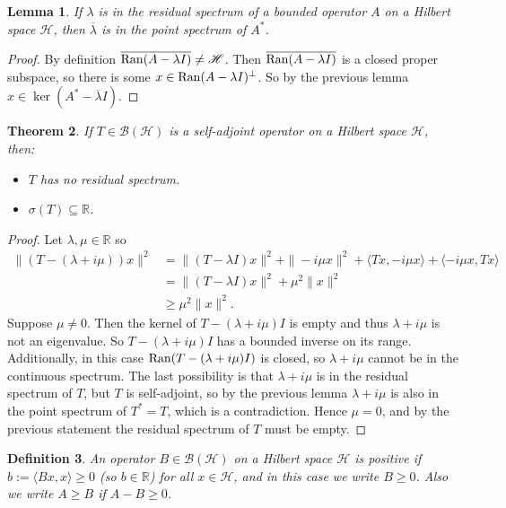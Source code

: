 \documentclass[12pt,oneside]{report}
\newtheorem{thm}{Theorem}[chapter]
\newtheorem{lem}[thm]{Lemma}
\newtheorem{defn}[thm]{Definition}
\begin{document}
\begin{lem}
    If $\lambda$ is in the residual spectrum of a bounded operator $A$ on a Hilbert space $\mathscr{H}$, then $\overline{\lambda}$ is in the point spectrum of $A^{*}$.
\end{lem}
\begin{proof}
    By definition $\overline{\mathrm{Ran}(A - \lambda I)} \neq \mathscr{H}$. Then $\overline{\mathrm{Ran}(A - \lambda I)}$ is a closed proper subspace, so there is some $x \in \mathrm{Ran}(A - \lambda I)^{\perp}$. So by the previous lemma $x \in \ker(A^{*} - \overline{\lambda} I)$.
\end{proof}

\begin{thm}
    If $T \in \mathscr{B}(\mathscr{H})$ is a self-adjoint operator on a Hilbert space $\mathscr{H}$, then:
    \begin{itemize}
        \item[a)] $T$ has no residual spectrum.
        \item[b)] $\sigma(T) \subseteq \mathbb{R}$.
    \end{itemize}
\end{thm}
\begin{proof}
    Let $\lambda, \mu \in \mathbb{R}$ so 
    \begin{align*}
        \|(T - (\lambda + i \mu))x\|^{2} &= \|(T - \lambda I)x\|^{2} + \|-i \mu x\|^{2} + \langle Tx, -i \mu x \rangle + \langle -i \mu x, Tx \rangle \\
        &= \|(T - \lambda I)x\|^{2} +\mu^{2}\|x\|^{2} \\
        &\geq \mu^{2}\|x\|^{2}.
    \end{align*}
    Suppose $\mu \neq 0$. Then the kernel of $T - (\lambda + i \mu)I$ is empty and thus $\lambda + i \mu$ is not an eigenvalue. So $T - (\lambda + i \mu)I$ has a bounded inverse on its range. Additionally, in this case $\mathrm{Ran}(T - (\lambda + i \mu)I)$ is closed, so $\lambda + i \mu$ cannot be in the continuous spectrum. The last possibility is that $\lambda + i \mu$ is in the residual spectrum of $T$, but $T$ is self-adjoint, so by the previous lemma $\lambda + i \mu$ is also in the point spectrum of $T^{*} = T$, which is a contradiction. Hence $\mu = 0$, and by the previous statement the residual spectrum of $T$ must be empty.
\end{proof}

\begin{defn}
    An operator $B \in \mathscr{B}(\mathscr{H})$ on a Hilbert space $\mathscr{H}$ is positive if $b := \langle Bx, x \rangle \geq 0$ (so $b \in \mathbb{R}$) for all $x \in \mathscr{H}$, and in this case we write $B \geq 0$. Also we write $A \geq B$ if $A - B \geq 0$.
\end{defn}
\end{document}
